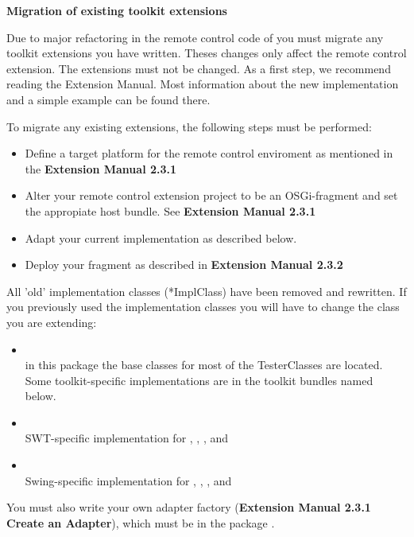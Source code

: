 \textbf{Migration of existing toolkit extensions}

Due to major refactoring in the remote control code of \app{} you must migrate any toolkit extensions you have written. Theses changes only affect the remote control extension. The \ite{} extensions must not be changed. As a first step, we recommend reading the Extension Manual. Most information about the new implementation and a simple example can be found there.

To migrate any existing extensions, the following steps must be performed:
\begin{itemize}
\item Define a target platform for the remote control enviroment as mentioned in the \textbf{Extension Manual 2.3.1}
\item Alter your remote control extension project to be an OSGi-fragment and set the appropiate host bundle. See \textbf{Extension Manual 2.3.1}
\item Adapt your current implementation as described below.
\item Deploy your fragment as described in \textbf{Extension Manual 2.3.2}
\end{itemize}

All 'old' implementation classes (*ImplClass) have been removed and rewritten. If you previously used the \app{} implementation classes  you will have to change the class you are extending:
\begin{itemize}
\item {}\\ in this package the base classes for most of the
  TesterClasses are located. Some toolkit-specific implementations are in the toolkit bundles named below.
\item {}\\ SWT-specific implementation for , , ,  and 
\item {}\\ Swing-specific implementation for , , ,  and 
\end{itemize}

You must also write your own adapter factory (\textbf{Extension Manual 2.3.1 Create an Adapter}), which must be in the package .

